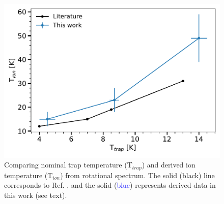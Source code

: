 \begin{figure}[!htb]
    \centering
    \includegraphics[scale=0.5]{figures/measurements/THz/CD+_Tcoll.pdf}
    \caption{Comparing nominal trap temperature (T$_{trap}$) and derived ion temperature (T$_{ion}$) from rotational spectrum. The solid (black) line corresponds to Ref. \cite{kluge_state-selective_2016}, and the solid (\textcolor{blue}{blue}) represents derived data in this work (see text).}
    \label{fig:Tcoll}
\end{figure}
